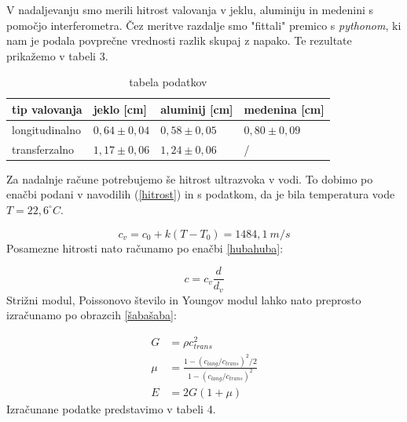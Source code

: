 \documentclass[12pt]{article}
\begin{document}
V nadaljevanju smo merili hitrost valovanja v jeklu, aluminiju in medenini s pomočjo interferometra. Čez meritve razdalje smo "fittali" premico s \textit{pythonom}, ki nam je podala povprečne vrednosti razlik skupaj z napako. Te rezultate prikažemo v tabeli 3.

\begin{center}
\begin{table}[h]
    \begin{center}
    \begin{tabular}{l|l|l|l}
    tip valovanja  & jeklo {[}cm{]}  & aluminij {[}cm{]} & medenina {[}cm{]} \\ \hline
    longitudinalno & $0,64 \pm 0,04$ & $0,58\pm 0,05$    & $0,80\pm 0,09$    \\
    transferzalno  & $1,17\pm 0,06$  & $1,24\pm 0,06$    & /                
    \end{tabular}
\end{center}
    \label{interferometer-tabela}
    \caption{tabela podatkov}
\end{table}
\end{center}
Za nadalnje račune potrebujemo še hitrost ultrazvoka v vodi. To dobimo po enačbi podani v navodilih (\ref{hitrost}) in s podatkom, da je bila temperatura vode $T = 22,6 ^{\circ}C$.

\begin{equation}
    c_v = c_0 + k(T-T_0) = 1484,1 \ m/s
    \label{hitrost}
\end{equation}
Posamezne hitrosti nato računamo po enačbi \ref{hubahuba}:

\begin{equation}
    c = c_v \frac{d}{d_v}
    \label{hubahuba}
\end{equation}
Strižni modul, Poissonovo število in Youngov modul lahko nato preprosto izračunamo po obrazcih \ref{šabašaba}:

\begin{equation}
    \begin{aligned}
        G &= \rho c_{trans}^2\\
        \mu &= \frac{1-(c_{lang}/c_{trans})^2/2}{1-(c_{lang}/c_{trans})^2}\\
        E &= 2G(1+\mu) 
    \end{aligned}
    \label{šabašaba}
\end{equation}
Izračunane podatke predstavimo v tabeli 4.
\end{document}
